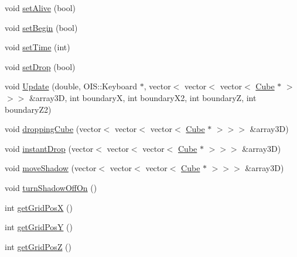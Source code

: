 \begin{DoxyCompactItemize}
\item 
void \hyperlink{class_cube_a231459dc0fc0e14dab32baf633e90421}{set\-Alive} (bool)
\item 
void \hyperlink{class_cube_ab327f06fa56b11034a39dadfb74befe1}{set\-Begin} (bool)
\item 
void \hyperlink{class_cube_a4aee4e28135320d6d9a9e4e76183ccd7}{set\-Time} (int)
\item 
void \hyperlink{class_cube_a3f080ff8cdd39ed48e765e9b113214dd}{set\-Drop} (bool)
\item 
void \hyperlink{class_cube_ab734970da4a45cb624a33b03e4dd4dde}{Update} (double, O\-I\-S\-::\-Keyboard $\ast$, vector$<$ vector$<$ vector$<$ \hyperlink{class_cube}{Cube} $\ast$ $>$$>$$>$ \&array3\-D, int boundary\-X, int boundary\-X2, int boundary\-Z, int boundary\-Z2)
\item 
void \hyperlink{class_cube_a3b48024a2741aa4ac7eb89b69eed03d2}{dropping\-Cube} (vector$<$ vector$<$ vector$<$ \hyperlink{class_cube}{Cube} $\ast$ $>$$>$$>$ \&array3\-D)
\item 
void \hyperlink{class_cube_add1622d7ae88092fb3fb77616db3afc5}{instant\-Drop} (vector$<$ vector$<$ vector$<$ \hyperlink{class_cube}{Cube} $\ast$ $>$$>$$>$ \&array3\-D)
\item 
void \hyperlink{class_cube_afc06499ed9e41e3d07b5599597aa2b66}{move\-Shadow} (vector$<$ vector$<$ vector$<$ \hyperlink{class_cube}{Cube} $\ast$ $>$$>$$>$ \&array3\-D)
\item 
void \hyperlink{class_cube_a4d9b84d6ed1528793330f3a2ed1703db}{turn\-Shadow\-Off\-On} ()
\item 
int \hyperlink{class_cube_aa336b96a7919871826d7f358f8e36a0b}{get\-Grid\-Pos\-X} ()
\item 
int \hyperlink{class_cube_a82ded9fc1fdfa1e971fad00ea25690f4}{get\-Grid\-Pos\-Y} ()
\item 
int \hyperlink{class_cube_abfb4fd724f2fe9f8eb9ff8a590c57d20}{get\-Grid\-Pos\-Z} ()
\end{DoxyCompactItemize}
